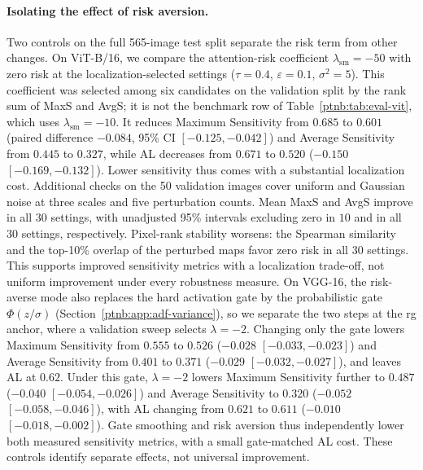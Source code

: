 \paragraph{Isolating the effect of risk aversion.}
Two controls on the full 565-image test split separate the risk term from other changes. On ViT-B/16, we compare the attention-risk coefficient $\lambda_{\mathrm{sm}}=-50$ with zero risk at the localization-selected settings ($\tau=0.4$, $\varepsilon=0.1$, $\sigma^2=5$). This coefficient was selected among six candidates on the validation split by the rank sum of MaxS and AvgS; it is not the benchmark row of Table~\ref{ptnb:tab:eval-vit}, which uses $\lambda_{\mathrm{sm}}=-10$. It reduces Maximum Sensitivity from $0.685$ to $0.601$ (paired difference $-0.084$, 95\% CI $[-0.125,-0.042]$) and Average Sensitivity from $0.445$ to $0.327$, while AL decreases from $0.671$ to $0.520$ ($-0.150$ $[-0.169,-0.132]$). Lower sensitivity thus comes with a substantial localization cost. Additional checks on the 50 validation images cover uniform and Gaussian noise at three scales and five perturbation counts. Mean MaxS and AvgS improve in all $30$ settings, with unadjusted 95\% intervals excluding zero in $10$ and in all $30$ settings, respectively. Pixel-rank stability worsens: the Spearman similarity and the top-10\% overlap of the perturbed maps favor zero risk in all $30$ settings. This supports improved sensitivity metrics with a localization trade-off, not uniform improvement under every robustness measure. On VGG-16, the risk-averse mode also replaces the hard activation gate by the probabilistic gate $\Phi(z/\sigma)$ (Section~\ref{ptnb:app:adf-variance}), so we separate the two steps at the \ac{rg} anchor, where a validation sweep selects $\lambda=-2$. Changing only the gate lowers Maximum Sensitivity from $0.555$ to $0.526$ ($-0.028$ $[-0.033,-0.023]$) and Average Sensitivity from $0.401$ to $0.371$ ($-0.029$ $[-0.032,-0.027]$), and leaves AL at $0.62$. Under this gate, $\lambda=-2$ lowers Maximum Sensitivity further to $0.487$ ($-0.040$ $[-0.054,-0.026]$) and Average Sensitivity to $0.320$ ($-0.052$ $[-0.058,-0.046]$), with AL changing from $0.621$ to $0.611$ ($-0.010$ $[-0.018,-0.002]$). Gate smoothing and risk aversion thus independently lower both measured sensitivity metrics, with a small gate-matched AL cost. These controls identify separate effects, not universal improvement.

